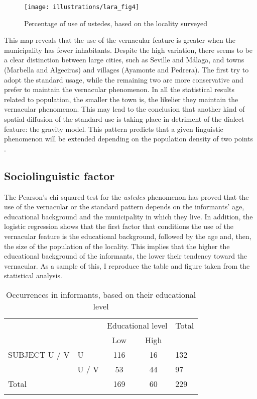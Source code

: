 \documentclass[output=paper]{LSP/langsci}
\begin{document}
\begin{figure}
\texttt{[image: illustrations/lara\_fig4]}
\label{fig:4}
\caption{Percentage of use of ustedes, based on the locality surveyed}
\end{figure}
  
This map reveals that the use of the vernacular feature is greater when the municipality has fewer inhabitants. Despite the high variation, there seems to be a clear distinction between large cities, such as Seville and Málaga, and towns (Marbella and Algeciras) and villages (Ayamonte and Pedrera). The first try to adopt the standard usage, while the remaining two are more conservative and prefer to maintain the vernacular phenomenon. In all the statistical results related to population, the smaller the town is, the likelier they maintain the vernacular phenomenon. This may lead to the conclusion that another kind of spatial diffusion of the standard use is taking place in detriment of the dialect feature: the gravity model. This pattern predicts that a given linguistic phenomenon will be extended depending on the population density of two points \citep{wolfram_dialectology_2003}.

\subsection{Sociolinguistic factor}
The Pearson’s chi squared test for the \textit{ustedes} phenomenon has proved that the use of the vernacular or the standard pattern depends on the informants’ age, educational background and the municipality in which they live. In addition, the logistic regression shows that the first factor that conditions the use of the vernacular feature is the educational background, followed by the age and, then, the size of the population of the locality. This implies that the higher the educational background of the informants, the lower their tendency toward the vernacular. As a sample of this, I reproduce the table and figure taken from the statistical analysis.

\begin{table}
\begin{tabular}{ll|cc|l}
\lsptoprule

& & \multicolumn{2}{c|}{Educational level} & Total\\
& & Low & High & \\

SUBJECT U / V & U & 116 & 16 & 132\\

& U / V & 53 & 44 & 97\\

Total & & 169 & 60 & 229\\

\lspbottomrule
\end{tabular}
\caption{Occurrences in informants, based on their educational level}
\label{tab:8}
\end{table} 
\end{document}
